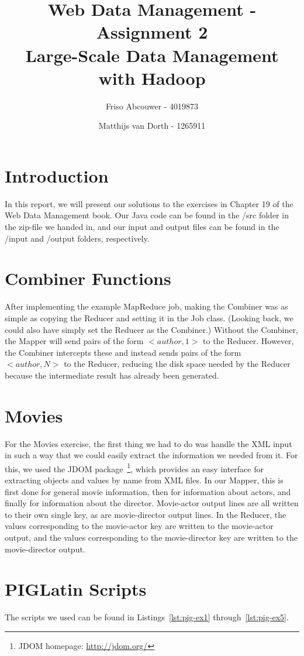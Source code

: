 \documentclass[11pt]{article}
\title{Web Data Management - Assignment 2 \\ Large-Scale Data Management with Hadoop}
\author{Friso Abcouwer - 4019873 \and Matthijs van Dorth - 1265911}
\begin{document}
\maketitle

\section{Introduction}
In this report, we will present our solutions to the exercises in Chapter 19 of the Web Data Management book.
Our Java code can be found in the /src folder in the zip-file we handed in, and our input and output files can be found in the /input and /output folders, respectively.

\section{Combiner Functions}
After implementing the example MapReduce job, making the Combiner was as simple as copying the Reducer and setting it in the Job class. (Looking back, we could also have simply set the Reducer as the Combiner.)
Without the Combiner, the Mapper will send pairs of the form $<author, 1>$ to the Reducer. However, the Combiner intercepts these and instead sends pairs of the form $<author,N>$ to the Reducer, reducing the disk space needed by the Reducer because the intermediate result has already been generated.

\section{Movies}
For the Movies exercise, the first thing we had to do was handle the XML input in such a way that we could easily extract the information we needed from it.
For this, we used the JDOM package~\footnote{JDOM homepage: \url{http://jdom.org/}}, which provides an easy interface for extracting objects and values by name from XML files. 
In our Mapper, this is first done for general movie information, then for information about actors, and finally for information about the director. Movie-actor output lines are all written to their own single key, as are movie-director output lines.  In the Reducer, the values corresponding to the movie-actor key are written to the movie-actor output, and the values corresponding to the movie-director key are written to the movie-director output.

\section{PIGLatin Scripts}
The scripts we used can be found in Listings~\ref{lst:pig-ex1} through~\ref{lst:pig-ex5}.
\end{document}
